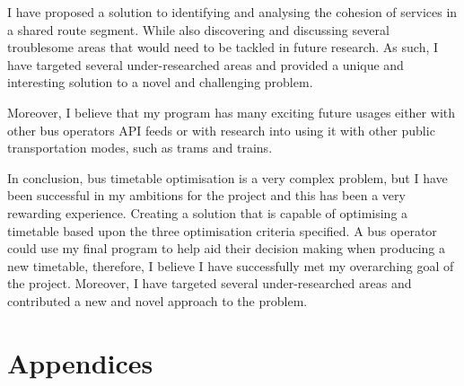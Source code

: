 \documentclass{article}
\begin{document}
\par 
I have proposed a solution to identifying and analysing the cohesion of services in a shared route segment. While also discovering and discussing several troublesome areas that would need to be tackled in future research. As such, I have targeted several under-researched areas and provided a unique and interesting solution to a novel and challenging problem. 

\par
Moreover, I believe that my program has many exciting future usages either with other bus operators API feeds or with research into using it with other public transportation modes, such as trams and trains. 

\par 
In conclusion, bus timetable optimisation is a very complex problem, but I have been successful in my ambitions for the project and this has been a very rewarding experience. Creating a solution that is capable of optimising a timetable based upon the three optimisation criteria specified. A bus operator could use my final program to help aid their decision making when producing a new timetable, therefore, I believe I have successfully met my overarching goal of the project. Moreover, I have targeted several under-researched areas and contributed a new and novel approach to the problem. 



\newpage

{}
\printbibliography %


\newpage
{}


\section*{Appendices}
\setcounter{section}{8}
\setcounter{subsection}{0}
%
\end{document}
